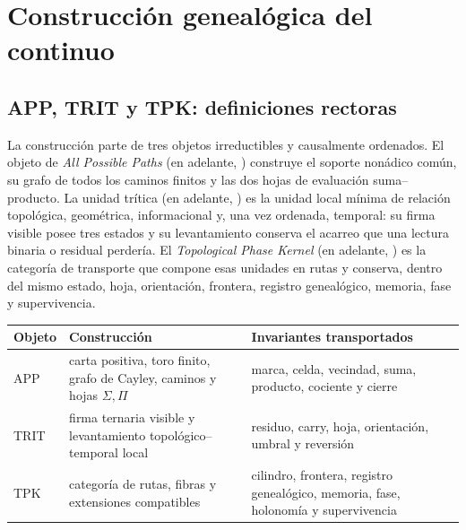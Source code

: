 \label{chap:83-03}

\section{Construcción genealógica del continuo}

\subsection{APP, TRIT y TPK: definiciones rectoras}

La construcción parte de tres objetos irreductibles y causalmente
ordenados. El objeto de \emph{All Possible Paths} (en adelante, \APP)
construye el soporte nonádico común, su grafo de todos los caminos finitos y
las dos hojas de evaluación suma--producto. La unidad trítica (en adelante,
\TRIT) es la unidad local mínima de relación topológica, geométrica,
informacional y, una vez ordenada, temporal: su firma visible posee tres
estados y su levantamiento conserva el acarreo que una lectura binaria o
residual perdería. El \emph{Topological Phase Kernel} (en adelante, \TPK)
es la categoría de transporte que compone esas unidades en rutas y conserva,
dentro del mismo estado, hoja, orientación, frontera, registro genealógico, memoria, fase y
supervivencia.

\begin{center}
\begin{tabularx}{.94\textwidth}{@{}p{}Y Y@{}}
\toprule
Objeto & Construcción & Invariantes transportados\\
\midrule
APP & carta positiva, toro finito, grafo de Cayley, caminos y hojas
\(\Sigma,\Pi\) & marca, celda, vecindad, suma, producto, cociente y cierre\\
TRIT & firma ternaria visible y levantamiento topológico--temporal local &
residuo, carry, hoja, orientación, umbral y reversión\\
TPK & categoría de rutas, fibras y extensiones compatibles & cilindro,
frontera, registro genealógico, memoria, fase, holonomía y supervivencia\\
\bottomrule
\end{tabularx}
\end{center}

